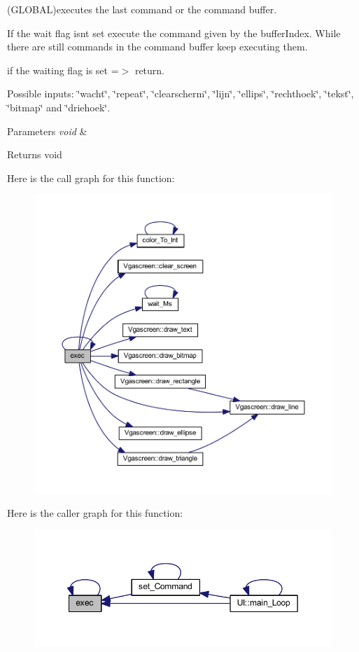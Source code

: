 (G\+L\+O\+B\+AL)executes the last command or the command buffer. 

If the wait flag isnt set execute the command given by the buffer\+Index. While there are still commands in the command buffer keep executing them.

if the waiting flag is set =$>$ return.

Possible inputs\+: \char`\"{}wacht\char`\"{}, \char`\"{}repeat\char`\"{}, \char`\"{}clearscherm\char`\"{}, \char`\"{}lijn\char`\"{}, \char`\"{}ellips\char`\"{}, \char`\"{}rechthoek\char`\"{}, \char`\"{}tekst\char`\"{}, \char`\"{}bitmap\char`\"{} and \char`\"{}driehoek\char`\"{}.


\begin{DoxyParams}{Parameters}
{\em void} & \\
\hline
\end{DoxyParams}
\begin{DoxyReturn}{Returns}
void 
\end{DoxyReturn}
Here is the call graph for this function\+:\nopagebreak
\begin{figure}[H]
\begin{center}
\leavevmode
\includegraphics[width=350pt]{namespace_l_l_ac98bc19f4e3468b76cfc2e43456527cc_cgraph}
\end{center}
\end{figure}
Here is the caller graph for this function\+:\nopagebreak
\begin{figure}[H]
\begin{center}
\leavevmode
\includegraphics[width=349pt]{namespace_l_l_ac98bc19f4e3468b76cfc2e43456527cc_icgraph}
\end{center}
\end{figure}
